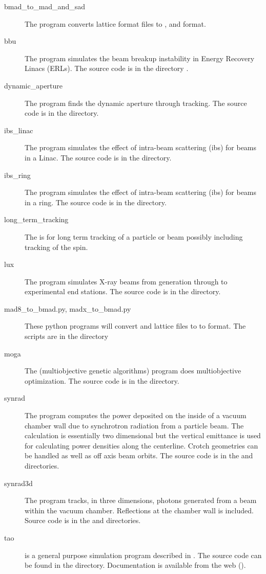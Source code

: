 \documentclass{hitec}     %
\begin{document}
  \begin{description}
%
  \item[bmad_to_mad_and_sad] \Newline
The  program converts \bmad lattice format files to ,  and
 format.
%
  \item[bbu] \Newline
The  program simulates the beam breakup instability in Energy Recovery Linacs (ERLs). The
source code is in the directory .
%
  \item[dynamic_aperture] \Newline
The  program finds the dynamic aperture through tracking. The source code is in
the  directory.
%
  \item[ibs_linac] \Newline
The  program simulates the effect of intra-beam scattering (ibs) for beams
in a Linac. The source code is in the  directory.
%
  \item[ibs_ring] \Newline
The  program simulates the effect of intra-beam scattering (ibs) for beams
in a ring. The source code is in the  directory.
%
  \item[long_term_tracking] \Newline
The  is for long term tracking of a particle or beam possibly
including tracking of the spin.
%
  \item[lux] \Newline
The  program simulates X-ray beams from generation through to experimental end stations.
The source code is in the  directory.
%
  \item[mad8_to_bmad.py, madx_to_bmad.py] \Newline
These python programs will convert  and  lattice files to to \bmad format. The
scripts are in the  directory
%
  \item[moga] \Newline
The  (multiobjective genetic algorithms) program does multiobjective
optimization. The source code is in the  directory.
%
  \item[synrad] \Newline
The  program computes the power deposited on the inside of a vacuum chamber
wall due to synchrotron radiation from a particle beam. The calculation is essentially two
dimensional but the vertical emittance is used for calculating power densities along the
centerline. Crotch geometries can be handled as well as off axis beam orbits. The source code 
is in the  and  directories. 
%
  \item[synrad3d] \Newline
The  program tracks, in three dimensions, photons generated from a beam
within the vacuum chamber. Reflections at the chamber wall is included. Source code is
in the  and  directories.
%
  \item[tao] \Newline
\tao is a general purpose simulation program described in . The source code can be
found in the  directory. Documentation is available from the web ().
  \end{description}
\end{document}
